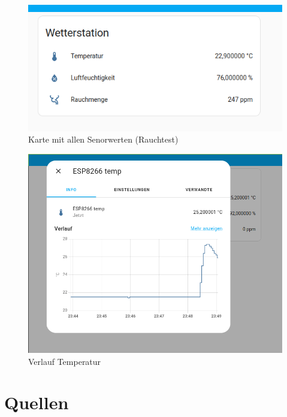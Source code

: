 \documentclass[a4paper, 11pt]{article}
\begin{document}
\begin{figure}[h]
    \begin{center}
        \includegraphics[width=12cm]{sm_card.png}
        \caption{Karte mit allen Senorwerten (Rauchtest)}
    \end{center}
\end{figure}

\begin{figure}[h]
    \begin{center}
        \includegraphics[width=12cm]{temp_hist.png}
    \caption{Verlauf Temperatur}
    \end{center}
\end{figure}

\clearpage

\section{Quellen}
\end{document}
